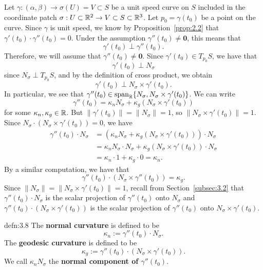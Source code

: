 Let $\gamma : (\alpha, \beta) \to \sigma(U) = V \subset S$ be a unit speed 
curve on $S$ included in the coordinate patch $\sigma : U \subset \mathbb{R}^2 
\to V \subset S \subset \mathbb{R}^3$. Let $p_0 = \gamma(t_0)$ be a point on the 
curve. Since $\gamma$ is unit speed, we know by Proposition~\ref{prop:2.2} 
that $\gamma'(t_0) \cdot \gamma''(t_0) = 0$. Under the assumption 
$\gamma''(t_0) \neq \mathbf 0$, this means that 
\[ \gamma'(t_0) \perp \gamma''(t_0). \]
Therefore, we will assume that $\gamma''(t_0) \neq \mathbf 0$. 
Since $\gamma'(t_0) \in T_{p_0}S$, we have that 
\[ \gamma'(t_0) \perp N_\sigma \] 
since $N_\sigma \perp T_{p_0}S$, and by the definition of cross product, we obtain 
\[ \gamma'(t_0) \perp N_\sigma \times \gamma'(t_0). \] 
In particular, we see that $\gamma''(t_0) \in \operatorname{span}_{\mathbb{R}}\{N_\sigma, N_\sigma 
\times \gamma'(t_0)\}$. We can write 
\[ \gamma''(t_0) = \kappa_n N_\sigma + \kappa_g (N_\sigma \times \gamma'(t_0)) \] 
for some $\kappa_n, \kappa_g \in \mathbb{R}$. But $\|\gamma'(t_0)\| = \|N_\sigma\| = 1$,
so $\|N_\sigma \times \gamma'(t_0)\| = 1$. Since 
$N_\sigma \cdot (N_\sigma \times \gamma'(t_0)) = 0$,
we have 
\begin{align*}
    \gamma''(t_0) \cdot N_\sigma 
    &= (\kappa_n N_\sigma + \kappa_g (N_\sigma \times \gamma'(t_0))) \cdot N_\sigma \\ 
    &= \kappa_n N_\sigma \cdot N_\sigma + \kappa_g (N_\sigma \times \gamma'(t_0)) \cdot N_\sigma \\ 
    &= \kappa_n \cdot 1 + \kappa_g \cdot 0 = \kappa_n. 
\end{align*}
By a similar computation, we have that 
\[ \gamma''(t_0) \cdot (N_\sigma \times \gamma''(t_0)) = \kappa_g. \] 
Since $\|N_\sigma\| = \|N_\sigma \times \gamma'(t_0)\| = 1$, recall from 
Section~\ref{subsec:3.2} that $\gamma''(t_0) \cdot N_\sigma$ is the scalar 
projection of $\gamma''(t_0)$ onto $N_\sigma$ and $\gamma''(t_0) \cdot 
(N_\sigma \times \gamma'(t_0))$ is the scalar projection of $\gamma''(t_0)$ 
onto $N_\sigma \times \gamma'(t_0)$. 

\begin{defn}{defn:3.8}
    The {\bf normal curvature} is defined to be 
    \[ \kappa_n := \gamma''(t_0) \cdot N_\sigma. \] 
    The {\bf geodesic curvature} is defined to be 
    \[ \kappa_g := \gamma''(t_0) \cdot (N_\sigma \times \gamma'(t_0)). \] 
    We call $\kappa_n N_\sigma$ the {\bf normal component of $\gamma''(t_0)$}.
\end{defn}\vspace{-0.25cm}

